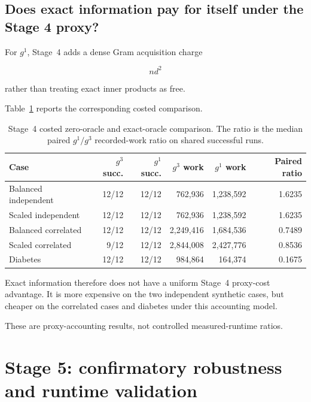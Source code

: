 \documentclass[11pt]{article}
\begin{document}
\FloatBarrier


\subsection{Does exact information pay for itself under the Stage 4 proxy?}

For $g^1$, Stage~4 adds a dense Gram acquisition charge

\[
nd^2
\]

rather than treating exact inner products as free.

Table~\ref{tab:stage4-cost} reports the corresponding costed comparison.

\begin{table}[!htbp]
\centering
\caption{
Stage~4 costed zero-oracle and exact-oracle comparison.
The ratio is the median paired $g^1/g^3$ recorded-work ratio on
shared successful runs.
}
\label{tab:stage4-cost}
\small
\begin{tabular}{lrrrrr}
\toprule
Case
& $g^3$ succ.
& $g^1$ succ.
& $g^3$ work
& $g^1$ work
& Paired ratio \\
\midrule
Balanced independent
& 12/12 & 12/12 & 762,936 & 1,238,592 & 1.6235 \\

Scaled independent
& 12/12 & 12/12 & 762,936 & 1,238,592 & 1.6235 \\

Balanced correlated
& 12/12 & 12/12 & 2,249,416 & 1,684,536 & 0.7489 \\

Scaled correlated
& 9/12 & 12/12 & 2,844,008 & 2,427,776 & 0.8536 \\

Diabetes
& 12/12 & 12/12 & 984,864 & 164,374 & 0.1675 \\
\bottomrule
\end{tabular}
\end{table}

Exact information therefore does not have a uniform Stage~4 proxy-cost
advantage. It is more expensive on the two independent synthetic cases,
but cheaper on the correlated cases and diabetes under this accounting
model.

These are proxy-accounting results, not controlled measured-runtime
ratios.


\section{Stage 5: confirmatory robustness and runtime validation}
\end{document}
